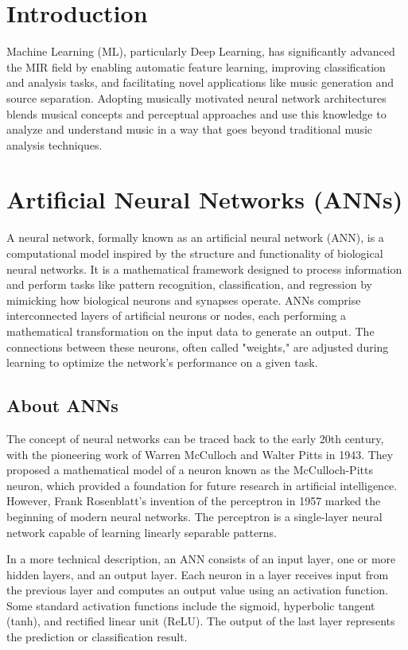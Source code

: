 \section{Introduction}
Machine Learning (ML), particularly Deep Learning, has significantly advanced the MIR field by enabling automatic feature learning, improving classification and analysis tasks, and facilitating novel applications like music generation and source separation. Adopting musically motivated neural network architectures \cite{musicmotivCNN} blends musical concepts and perceptual approaches and use this knowledge to analyze and understand music in a way that goes beyond traditional music analysis techniques. 

\section{Artificial Neural Networks (ANNs)}
A neural network, formally known as an artificial neural network (ANN), is a computational model inspired by the structure and functionality of biological neural networks. It is a mathematical framework designed to process information and perform tasks like pattern recognition, classification, and regression by mimicking how biological neurons and synapses operate. ANNs comprise interconnected layers of artificial neurons or nodes, each performing a mathematical transformation on the input data to generate an output. The connections between these neurons, often called "weights," are adjusted during learning to optimize the network's performance on a given task.

\subsection{About ANNs}
The concept of neural networks can be traced back to the early 20th century, with the pioneering work of Warren McCulloch and Walter Pitts in 1943. They proposed a mathematical model of a neuron known as the McCulloch-Pitts neuron, which provided a foundation for future research in artificial intelligence. However, Frank Rosenblatt's invention of the perceptron in 1957 marked the beginning of modern neural networks. The perceptron is a single-layer neural network capable of learning linearly separable patterns.





In a more technical description, an ANN consists of an input layer, one or more hidden layers, and an output layer. Each neuron in a layer receives input from the previous layer and computes an output value using an activation function. Some standard activation functions include the sigmoid, hyperbolic tangent (tanh), and rectified linear unit (ReLU). The output of the last layer represents the prediction or classification result.

